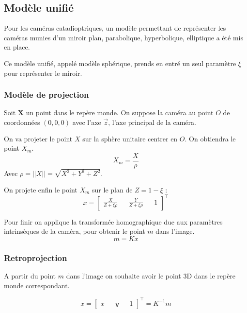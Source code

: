 \subsection{Modèle unifié}

Pour les caméras catadioptriques, un modèle permettant de représenter les caméras munies d'un miroir plan, parabolique, hyperbolique, elliptique a été mis en place.

Ce modèle unifié, appelé modèle sphérique, prends en entré un seul paramètre $\xi$ pour représenter le miroir.


\subsubsection{Modèle de projection}

Soit $\mathbf{X}$ un point dans le repère monde.
On suppose la caméra au point $O$ de coordonnées $(0,0,0)$ avec l'axe $\vec{z}$, l'axe principal de la caméra.

On va projeter le point $X$ sur la sphère unitaire centrer en $O$. On obtiendra le point $X_m$.
\begin{equation}
X_m = \frac{X}{\rho}
\end{equation}
Avec $\rho = ||X|| = \sqrt{X^2+Y^2+Z^2}$.

On projete enfin le point $X_m$ sur le plan de $Z = 1 - \xi$ :
\begin{equation}
x = \begin{bmatrix}  \frac{X}{Z+\xi \rho} && \frac{Y}{Z +\xi \rho} && 1 \end{bmatrix}^{\top}
\end{equation}

Pour finir on applique la transformée homographique due aux paramètres intrinsèques de la caméra, pour obtenir le point $m$ dans l'image.
\begin{equation}
m= K x
\end{equation}

\subsubsection{Retroprojection}

A partir du point $m$ dans l'image on souhaite avoir le point 3D dans le repère monde correspondant.

\begin{equation}
x = \begin{bmatrix} x && y && 1 \end{bmatrix}^{\top} = K^{-1} m
\end{equation}

